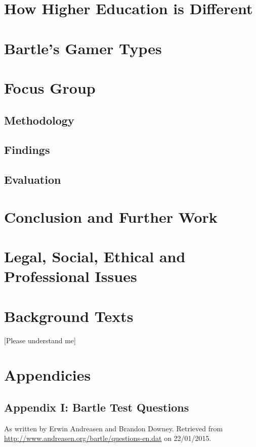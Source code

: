 \documentclass[12pt]{article}
\begin{document}
\section{How Higher Education is Different}

\section{Bartle's Gamer Types}

\section{Focus Group}

\subsection{Methodology}

\subsection{Findings}

\subsection{Evaluation}

\section{Conclusion and Further Work}

\section{Legal, Social, Ethical and Professional Issues}
\label{sec:issues}

\section{Background Texts}
[Please understand me]

\section{Appendicies}
\subsection{Appendix I: Bartle Test Questions}
As written by Erwin Andreasen and Brandon Downey. Retrieved from \url{http://www.andreasen.org/bartle/questions-en.dat} on 22/01/2015.
\linespread{1.0}

\linespread{1.3}



\end{document}
